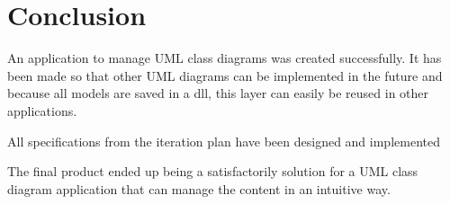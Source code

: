 \chapter{Conclusion}
An application to manage UML class diagrams was created successfully. It has been made so that other UML diagrams can be implemented in the future and because all models are saved in a dll, this layer can easily be reused in other applications.

All specifications from the iteration plan have been designed and implemented

The final product ended up being a satisfactorily solution for a UML class diagram application that can manage the content in an intuitive way.